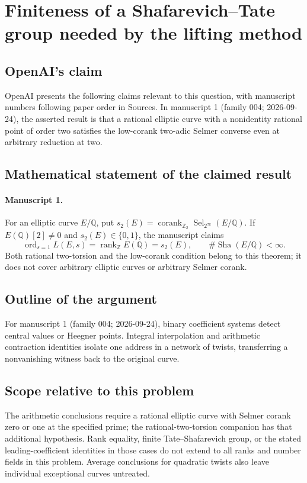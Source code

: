 \documentclass[11pt]{article}
\begin{document}
\section*{Finiteness of a Shafarevich–Tate group needed by the lifting method}

\subsection{OpenAI's claim}
OpenAI presents the following claims relevant to this question, with manuscript numbers following paper order in Sources. In manuscript 1 (family 004; 2026-09-24), the asserted result is that a rational elliptic curve with a nonidentity rational point of order two satisfies the low-corank two-adic Selmer converse even at arbitrary reduction at two.

\subsection{Mathematical statement of the claimed result}
\paragraph{Manuscript 1.}
For an elliptic curve $E/\mathbb Q$, put $s_2(E)=\operatorname{corank}_{\mathbb Z_2}\operatorname{Sel}_{2^{\infty}}(E/\mathbb Q)$. If $E(\mathbb Q)[2]\ne0$ and $s_2(E)\in\{0,1\}$, the manuscript claims
\[
 \operatorname{ord}_{s=1}L(E,s)=\operatorname{rank}_{\mathbb Z}E(\mathbb Q)=s_2(E),\qquad
 \#\operatorname{Sha}(E/\mathbb Q)<\infty.
\]
Both rational two-torsion and the low-corank condition belong to this theorem; it does not cover arbitrary elliptic curves or arbitrary Selmer corank.

\subsection{Outline of the argument}
For manuscript 1 (family 004; 2026-09-24), binary coefficient systems detect central values or Heegner points. Integral interpolation and arithmetic contraction identities isolate one address in a network of twists, transferring a nonvanishing witness back to the original curve.

\subsection{Scope relative to this problem}
The arithmetic conclusions require a rational elliptic curve with Selmer corank zero or one at the specified prime; the rational-two-torsion companion has that additional hypothesis. Rank equality, finite Tate--Shafarevich group, or the stated leading-coefficient identities in those cases do not extend to all ranks and number fields in this problem. Average conclusions for quadratic twists also leave individual exceptional curves untreated.
\end{document}
